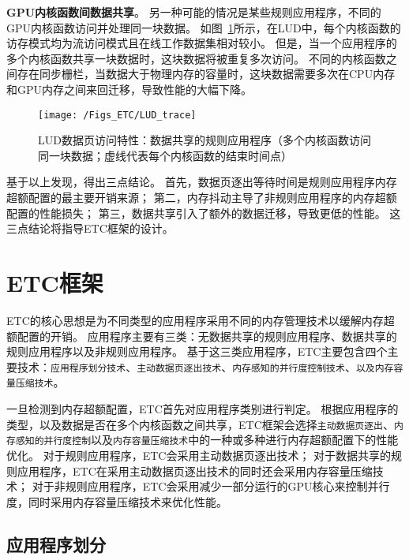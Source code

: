 \textbf{GPU内核函数间数据共享}。
另一种可能的情况是某些规则应用程序，不同的GPU内核函数访问并处理同一块数据。
如图~\ref{fig:LUD_trace}所示，在LUD中，每个内核函数的访存模式均为流访问模式且在线工作数据集相对较小。
但是，当一个应用程序的多个内核函数共享一块数据时，这块数据将被重复多次访问。
不同的内核函数之间存在同步栅栏，当数据大于物理内存的容量时，这块数据需要多次在CPU内存和GPU内存之间来回迁移，导致性能的大幅下降。

\begin{figure}[htbp] %
  \centering
  \texttt{[image: /Figs\_ETC/LUD\_trace]}
  \caption{LUD数据页访问特性：数据共享的规则应用程序（多个内核函数访问同一块数据；虚线代表每个内核函数的结束时间点）}
  \label{fig:LUD_trace}
\end{figure}

基于以上发现，得出三点结论。
首先，数据页逐出等待时间是规则应用程序内存超额配置的最主要开销来源；
第二，内存抖动主导了非规则应用程序的内存超额配置的性能损失；
第三，数据共享引入了额外的数据迁移，导致更低的性能。
这三点结论将指导ETC框架的设计。

\section{ETC框架}
\label{sec:etcdesign}

ETC的核心思想是为不同类型的应用程序采用不同的内存管理技术以缓解内存超额配置的开销。
应用程序主要有三类：无数据共享的规则应用程序、数据共享的规则应用程序以及非规则应用程序。
基于这三类应用程序，ETC主要包含四个主要技术：\texttt{应用程序划分技术}、\texttt{主动数据页逐出技术}、\texttt{内存感知的并行度控制技术}、\texttt{以及内存容量压缩技术}。

一旦检测到内存超额配置，ETC首先对应用程序类别进行判定。
根据应用程序的类型，以及数据是否在多个内核函数之间共享，ETC框架会选择\texttt{主动数据页逐出}、\texttt{内存感知的并行度控制}以及\texttt{内存容量压缩技术}中的一种或多种进行内存超额配置下的性能优化。
对于规则应用程序，ETC会采用主动数据页逐出技术；
对于数据共享的规则应用程序，ETC在采用主动数据页逐出技术的同时还会采用内存容量压缩技术；
对于非规则应用程序，ETC会采用减少一部分运行的GPU核心来控制并行度，同时采用内存容量压缩技术来优化性能。

\subsection{应用程序划分}
\label{AC}

